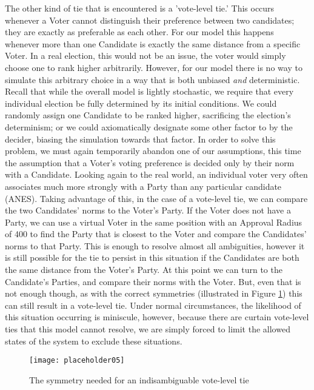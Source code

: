 \documentclass[12pt]{article}
\begin{document}
\qquad The other kind of tie that is encountered is a 'vote-level tie.' This occurs whenever a Voter cannot distinguish their preference between two candidates; they are exactly as preferable as each other. For our model this happens whenever more than one Candidate is exactly the same distance from a specific Voter. In a real election, this would not be an issue, the voter would simply choose one to rank higher arbitrarily. However, for our model there is no way to simulate this arbitrary choice in a way that is both unbiased \textit{and} deterministic. Recall that while the overall model is lightly stochastic, we require that every individual election be fully determined by its initial conditions. We could randomly assign one Candidate to be ranked higher, sacrificing the election's determinism; or we could axiomatically designate some other factor to by the decider, biasing the simulation towards that factor. In order to solve this problem, we must again temporarily abandon one of our assumptions, this time the assumption that a Voter's voting preference is decided only by their norm with a Candidate. Looking again to the real world, an individual voter very often associates much more strongly with a Party than any particular candidate (ANES). Taking advantage of this, in the case of a vote-level tie, we can compare the two Candidates' norms to the Voter's Party. If the Voter does not have a Party, we can use a virtual Voter in the same position with an Approval Radius of 400 to find the Party that is closest to the Voter and compare the Candidates' norms to that Party. This is enough to resolve almost all ambiguities, however it is still possible for the tie to persist in this situation if the Candidates are both the same distance from the Voter's Party. At this point we can turn to the Candidate's Parties, and compare their norms with the Voter. But, even that is not enough though, as with the correct symmetries (illustrated in Figure \ref{tieSymmetry}) this can still result in a vote-level tie. Under normal circumstances, the likelihood of this situation occurring is miniscule, however, because there are curtain vote-level ties that this model cannot resolve, we are simply forced to limit the allowed states of the system to exclude these situations.
\begin{figure}[H]
\centering
\texttt{[image: placeholder05]}
\caption{\footnotesize The symmetry needed for an indisambiguable vote-level tie}
\label{tieSymmetry}
\end{figure}
\end{document}
